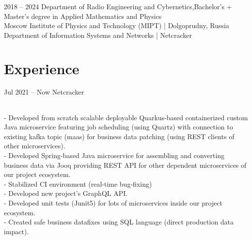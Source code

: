 \documentclass[]{cv-style}          %
\begin{document}
\begin{entrylist}
\entry
{2018 -- 2024}
{{\normalfont Department of Radio Engineering and Cybernetics,\newline Bachelor's + Master's degree in Applied Mathematics and Physics}}
{\\ Moscow Institute of Physics and Technology (MIPT)  |  Dolgoprudny, Russia \\Department of Information Systems and Networks | Netcracker}
{\vspace{-0.3cm}}
\end{entrylist}



\section{Experience}

\begin{entrylist}

\entry
    {Jul 2021 -- Now}
    {Netcracker}
    {}
    {
    \\- Developed from scratch scalable deployable Quarkus-based containerized custom Java microservice featuring job scheduling (using Quartz) with connection to existing kafka topic (maas) for business data patching (using REST clients of other microservices). 
    \\- Developed Spring-based Java microservice for assembling and converting business data via Jooq providing REST API for other dependent microservices of our project ecosystem.
    \\ - Stabilized CI environment (real-time bug-fixing)
    \\ - Developed new project's GraphQL API.
    \\ - Developed unit tests (Junit5) for lots of microservices inside our project ecosystem.
    \\ - Created safe business datafixes using SQL language (direct production data impact).   
    
}

\end{entrylist}
\end{document}
